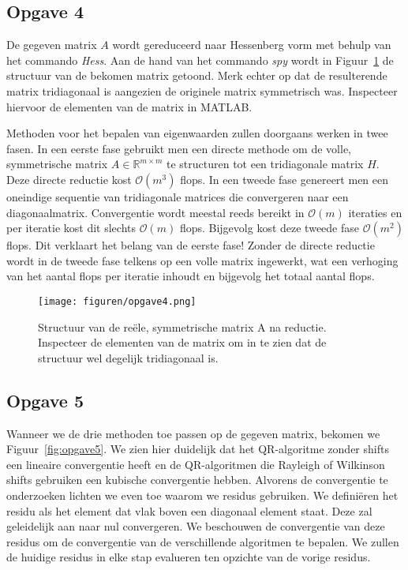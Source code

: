 \documentclass[a4paper, 12pt, titlepage]{report}
\begin{document}
\subsection{Opgave 4}
De gegeven matrix $A$ wordt gereduceerd naar Hessenberg vorm met behulp van het commando \emph{Hess}. Aan de hand van het commando \emph{spy} wordt in Figuur~\ref{fig:opgave4} de structuur van de bekomen matrix getoond. Merk echter op dat de resulterende matrix tridiagonaal is aangezien de originele matrix symmetrisch was. Inspecteer hiervoor de elementen van de matrix in MATLAB.

Methoden voor het bepalen van eigenwaarden zullen doorgaans werken in twee fasen. In een eerste fase gebruikt men een directe methode om de volle, symmetrische matrix $A \in \mathbb{R}^{m \times m}$ te structuren tot een tridiagonale matrix $H$. Deze directe reductie kost $\mathcal{O}(m^3)$ flops. In een tweede fase genereert men een oneindige sequentie van tridiagonale matrices die convergeren naar een diagonaalmatrix. Convergentie wordt meestal reeds bereikt in $\mathcal{O}(m)$ iteraties en per iteratie kost dit slechts $\mathcal{O}(m)$ flops. Bijgevolg kost deze tweede fase $\mathcal{O}(m^2)$ flops. Dit verklaart het belang van de eerste fase! Zonder de directe reductie wordt in de tweede fase telkens op een volle matrix ingewerkt, wat een verhoging van het aantal flops per iteratie inhoudt en bijgevolg het totaal aantal flops.

\begin{figure}[htb]
	\centering
	\texttt{[image: figuren/opgave4.png]}
	\caption{Structuur van de re\"ele, symmetrische matrix A na reductie. Inspecteer de elementen van de matrix om in te zien dat de structuur wel degelijk tridiagonaal is.}
	\label{fig:opgave4}
\end{figure}

\subsection{Opgave 5}
Wanneer we de drie methoden toe passen op de gegeven matrix, bekomen we Figuur~\ref{fig:opgave5}. We zien hier duidelijk dat het QR-algoritme zonder shifts een lineaire convergentie heeft en de QR-algoritmen die Rayleigh of Wilkinson shifts gebruiken een kubische convergentie hebben. Alvorens de convergentie te onderzoeken lichten we even toe waarom we residus gebruiken. We defini\"eren het residu als het element dat vlak boven een diagonaal element staat. Deze zal geleidelijk aan naar nul convergeren. We beschouwen de convergentie van deze residus om de convergentie van de verschillende algoritmen te bepalen. We zullen de huidige residus in elke stap evalueren ten opzichte van de vorige residus. 
\end{document}
